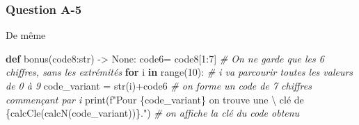 \documentclass[
  12pt,
  a4paper,
]{article}
\newenvironment{Shaded}{}{}
\newcommand{\BuiltInTok}[1]{#1}
\newcommand{\CharTok}[1]{\textcolor[rgb]{0.25,0.44,0.63}{#1}}
\newcommand{\CommentTok}[1]{\textcolor[rgb]{0.38,0.63,0.69}{\textit{#1}}}
\newcommand{\ControlFlowTok}[1]{\textcolor[rgb]{0.00,0.44,0.13}{\textbf{#1}}}
\newcommand{\DecValTok}[1]{\textcolor[rgb]{0.25,0.63,0.44}{#1}}
\newcommand{\KeywordTok}[1]{\textcolor[rgb]{0.00,0.44,0.13}{\textbf{#1}}}
\newcommand{\NormalTok}[1]{#1}
\newcommand{\OperatorTok}[1]{\textcolor[rgb]{0.40,0.40,0.40}{#1}}
\newcommand{\SpecialCharTok}[1]{\textcolor[rgb]{0.25,0.44,0.63}{#1}}
\newcommand{\SpecialStringTok}[1]{\textcolor[rgb]{0.73,0.40,0.53}{#1}}
\newcommand{\VariableTok}[1]{\textcolor[rgb]{0.10,0.09,0.49}{#1}}
\begin{document}
\hypertarget{question-a-5}{%
\subsubsection{Question A-5}\label{question-a-5}}

De même

\begin{Shaded}
\begin{Highlighting}[]
\KeywordTok{def}\NormalTok{ bonus(code8:}\BuiltInTok{str}\NormalTok{) }\OperatorTok{{-}\textgreater{}} \VariableTok{None}\NormalTok{:}
\NormalTok{    code6}\OperatorTok{=}\NormalTok{ code8[}\DecValTok{1}\NormalTok{:}\DecValTok{7}\NormalTok{] }\CommentTok{\# On ne garde que les 6 chiffres, sans les extrémités }
    \ControlFlowTok{for}\NormalTok{ i }\KeywordTok{in} \BuiltInTok{range}\NormalTok{(}\DecValTok{10}\NormalTok{):  }\CommentTok{\# i va parcourir toutes les valeurs de 0 à 9}
\NormalTok{        code\_variant }\OperatorTok{=} \BuiltInTok{str}\NormalTok{(i)}\OperatorTok{+}\NormalTok{code6 }\CommentTok{\# on forme un code de 7 chiffres commençant par i}
        \BuiltInTok{print}\NormalTok{(}\SpecialStringTok{f"Pour }\SpecialCharTok{\{}\NormalTok{code\_variant}\SpecialCharTok{\}}\SpecialStringTok{ on trouve une  }\CharTok{\textbackslash{}}
\SpecialStringTok{        clé de }\SpecialCharTok{\{}\NormalTok{calcCle(calcN(code\_variant))}\SpecialCharTok{\}}\SpecialStringTok{."}\NormalTok{)  }\CommentTok{\# on affiche la clé du code obtenu}
\end{Highlighting}
\end{Shaded}
\end{document}
